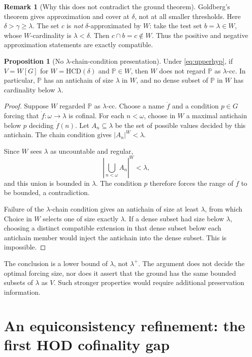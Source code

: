 \documentclass[11pt,letterpaper]{article}
\theoremstyle{definition}
\newtheorem{proposition}[definition]{Proposition}
\newcommand{\HCD}{\mathrm{HCD}}
\newtheorem{remark}[definition]{Remark}
\begin{document}
\begin{remark}[Why this does not contradict the ground theorem]
Goldberg's theorem gives approximation and cover at $\delta$, not at all smaller thresholds. Here $\delta>\gamma\geq\lambda$. The set $c$ is \emph{not} $\delta$-approximated by $W$: take the test set $b=\lambda\in W$, whose $W$-cardinality is $\lambda<\delta$. Then $c\cap b=c\notin W$. Thus the positive and negative approximation statements are exactly compatible.
\end{remark}

\begin{proposition}[No $\lambda$-chain-condition presentation]\label{prop:forcingcost}
Under \eqref{eq:upperhyp}, if $V=W[G]$ for $W=\HCD(\delta)$ and $\mathbb P\in W$, then $W$ does not regard $\mathbb P$ as $\lambda$-cc. In particular, $\mathbb P$ has an antichain of size $\lambda$ in $W$, and no dense subset of $\mathbb P$ in $W$ has cardinality below $\lambda$.
\end{proposition}

\begin{proof}
Suppose $W$ regarded $\mathbb P$ as $\lambda$-cc. Choose a name $\dot f$ and a condition $p\in G$ forcing that $\dot f:\omega\to\lambda$ is cofinal. For each $n<\omega$, choose in $W$ a maximal antichain below $p$ deciding $\dot f(n)$. Let $A_n\subseteq\lambda$ be the set of possible values decided by this antichain. The chain condition gives $|A_n|^W<\lambda$.

Since $W$ sees $\lambda$ as uncountable and regular,
\[
             \left|\bigcup_{n<\omega}A_n\right|^W<\lambda,
\]
and this union is bounded in $\lambda$. The condition $p$ therefore forces the range of $\dot f$ to be bounded, a contradiction.

Failure of the $\lambda$-chain condition gives an antichain of size at least $\lambda$, from which Choice in $W$ selects one of size exactly $\lambda$. If a dense subset had size below $\lambda$, choosing a distinct compatible extension in that dense subset below each antichain member would inject the antichain into the dense subset. This is impossible.
\end{proof}

The conclusion is a lower bound of $\lambda$, not $\lambda^+$. The argument does not decide the optimal forcing size, nor does it assert that the ground has the same bounded subsets of $\lambda$ as $V$. Such stronger properties would require additional preservation information.

\section{An equiconsistency refinement: the first HOD cofinality gap}\label{sec:profile}
\end{document}
